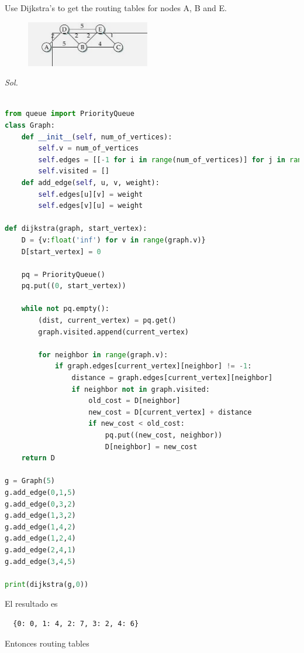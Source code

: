 \documentclass{assignment}
\begin{document}
\newpage
\begin{ex}
Use Dijkstra's to get the routing tables for nodes A, B and E.
\end{ex}
\begin{figure}[h]
\begin{center}
  \includegraphics[scale=0.98]{1.png}
\end{center}
\label{fig:fig}
\end{figure}
\textit{ Sol. }

\begin{lstlisting}[language=Python]
  
from queue import PriorityQueue
class Graph:
    def __init__(self, num_of_vertices):
        self.v = num_of_vertices
        self.edges = [[-1 for i in range(num_of_vertices)] for j in range(num_of_vertices)]
        self.visited = []
    def add_edge(self, u, v, weight):
        self.edges[u][v] = weight
        self.edges[v][u] = weight

def dijkstra(graph, start_vertex):
    D = {v:float('inf') for v in range(graph.v)}
    D[start_vertex] = 0

    pq = PriorityQueue()
    pq.put((0, start_vertex))

    while not pq.empty():
        (dist, current_vertex) = pq.get()
        graph.visited.append(current_vertex)

        for neighbor in range(graph.v):
            if graph.edges[current_vertex][neighbor] != -1:
                distance = graph.edges[current_vertex][neighbor]
                if neighbor not in graph.visited:
                    old_cost = D[neighbor]
                    new_cost = D[current_vertex] + distance
                    if new_cost < old_cost:
                        pq.put((new_cost, neighbor))
                        D[neighbor] = new_cost
    return D

g = Graph(5)
g.add_edge(0,1,5)
g.add_edge(0,3,2)
g.add_edge(1,3,2)
g.add_edge(1,4,2)
g.add_edge(1,2,4)
g.add_edge(2,4,1)
g.add_edge(3,4,5)

print(dijkstra(g,0))
\end{lstlisting}

El resultado es 
\begin{lstlisting}
  {0: 0, 1: 4, 2: 7, 3: 2, 4: 6}
\end{lstlisting}
Entonces routing tables
\end{document}
